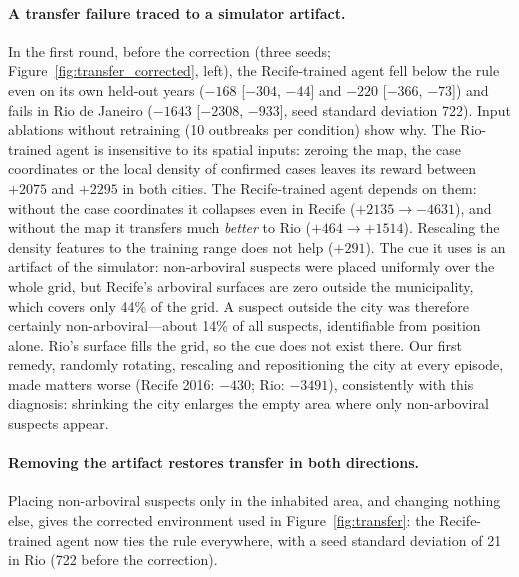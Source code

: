 \documentclass[11pt,a4paper]{article}
\begin{document}
\paragraph{A transfer failure traced to a simulator artifact.} In the first round, before the correction (three seeds; Figure~\ref{fig:transfer_corrected}, left), the Recife-trained agent fell below the rule even on its own held-out years ($-168$ [$-304$, $-44$] and $-220$ [$-366$, $-73$]) and fails in Rio de Janeiro ($-1643$ [$-2308$, $-933$], seed standard deviation 722). Input ablations without retraining (10 outbreaks per condition) show why. The Rio-trained agent is insensitive to its spatial inputs: zeroing the map, the case coordinates or the local density of confirmed cases leaves its reward between $+2075$ and $+2295$ in both cities. The Recife-trained agent depends on them: without the case coordinates it collapses even in Recife ($+2135 \to -4631$), and without the map it transfers much \emph{better} to Rio ($+464 \to +1514$). Rescaling the density features to the training range does not help ($+291$). The cue it uses is an artifact of the simulator: non-arboviral suspects were placed uniformly over the whole grid, but Recife's arboviral surfaces are zero outside the municipality, which covers only 44\% of the grid. A suspect outside the city was therefore certainly non-arboviral---about 14\% of all suspects, identifiable from position alone. Rio's surface fills the grid, so the cue does not exist there. Our first remedy, randomly rotating, rescaling and repositioning the city at every episode, made matters worse (Recife 2016: $-430$; Rio: $-3491$), consistently with this diagnosis: shrinking the city enlarges the empty area where only non-arboviral suspects appear.

\paragraph{Removing the artifact restores transfer in both directions.} Placing non-arboviral suspects only in the inhabited area, and changing nothing else, gives the corrected environment used in Figure~\ref{fig:transfer}: the Recife-trained agent now ties the rule everywhere, with a seed standard deviation of 21 in Rio (722 before the correction).
\end{document}
